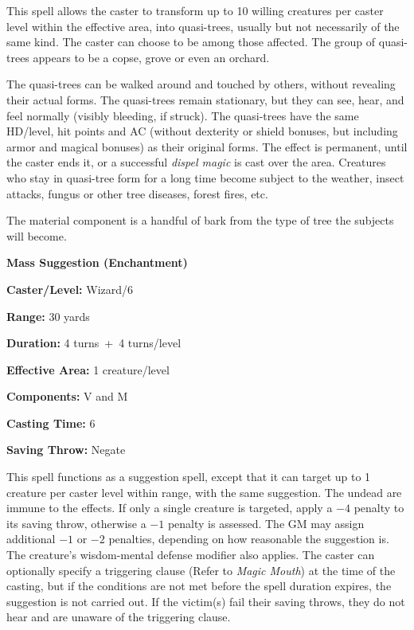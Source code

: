 \begin{multicols}{2}
This spell allows the caster to transform up to 10 willing creatures per caster level within the effective area, into quasi-trees, usually but not necessarily of the same kind.  The caster can choose to be among those affected.  The group of quasi-trees appears to be a copse, grove or even an orchard.

The quasi-trees can be walked around and touched by others, without revealing their actual forms.  The quasi-trees remain stationary, but they can see, hear, and feel normally (visibly bleeding, if struck).  The quasi-trees have the same HD/level, hit points and AC (without dexterity or shield bonuses, but including armor and magical bonuses) as their original forms.  The effect is permanent, until the caster ends it, or a successful \textit{dispel magic} is cast over the area.  Creatures who stay in quasi-tree form for a long time become subject to the weather, insect attacks, fungus or other tree diseases, forest fires, etc.

The material component is a handful of bark from the type of tree the subjects will become.

\vspace{1em}

\noindent
\begin{minipage}{\columnwidth}

\noindent \textbf{Mass Suggestion (Enchantment)}

\noindent \textbf{Caster/Level:} Wizard/6

\noindent \textbf{Range:} 30 yards

\noindent \textbf{Duration:} 4 turns~+~4 turns/level

\noindent \textbf{Effective Area:} 1 creature/level

\noindent \textbf{Components:} V and M

\noindent \textbf{Casting Time:} 6

\noindent \textbf{Saving Throw:} Negate

\end{minipage}

This spell functions as a suggestion spell, except that it can target up to 1 creature per caster level within range, with the same suggestion.  The undead are immune to the effects.  If only a single creature is targeted, apply a $-4$ penalty to its saving throw, otherwise a $-1$ penalty is assessed.  The GM may assign additional $-1$ or $-2$ penalties, depending on how reasonable the suggestion is.  The creature's wisdom-mental defense modifier also applies.  The caster can optionally specify a triggering clause (Refer to \textit{Magic Mouth}) at the time of the casting, but if the conditions are not met before the spell duration expires, the suggestion is not carried out.  If the victim(s) fail their saving throws, they do not hear and are unaware of the triggering clause. 


\end{multicols}
